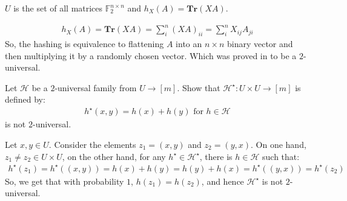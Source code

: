 \newcommand*{\TR}{\mathbf{Tr}}
\begin{exercise}
  $U$ is the set of all matrices $\mathbb{F}_{2}^{n\times n}$ and $h_{X}(A) = \mathbf{Tr} \left(XA\right) $. 
\end{exercise}

\begin{solution}
  \begin{equation*}
    \begin{split}
    h_{X}(A) = \mathbf{Tr} \left(XA\right) = \sum_{i}^{n} (XA)_{ii} =  \sum_{i}^{n} X_{ij}A_{ji}
    \end{split}
  \end{equation*}
  So, the hashing is equivalence to flattening $ A $ into an $ n \times n $ binary vector and then multiplying it by a randomly chosen vector. Which was proved in  to be a $2$-universal. 
\end{solution}


%
%
\begin{exercise}
Let $\mathcal{H}$ be a $2$-universal family from $U \rightarrow [m]$. Show that $\mathcal{H}^{\star} : U \times U \rightarrow [m]$ is defined by:
  \begin{equation*}
    \begin{split}
      h^{\star}(x,y) = h(x) + h(y)  \text{ for } h\in \mathcal{H}
    \end{split}
  \end{equation*}
  is not $2$-universal.
\end{exercise}

\begin{solution}
  Let $x, y \in U$. Consider the elements $z_{1} = (x, y)$ and $z_{2} = (y, x)$. On one hand, $z_{1} \neq z_{2} \in U \times U$, on the other hand, for any $h^{\star} \in \mathcal{H}^{\star}$, there is $h \in \mathcal{H}$ such that:
  \begin{equation*}
    \begin{split}
      h^{\star}(z_{1}) =  h^{\star}( (x,y) ) = h(x) + h(y) = h(y) + h(x) =  h^{\star}( (y,x) )  = h^{\star}(z_{2})
    \end{split}
  \end{equation*}
So, we get that with probability $1$, $h(z_{1}) = h(z_{2})$, and hence $\mathcal{H}^{\star}$ is not $2$-universal.
\end{solution}


